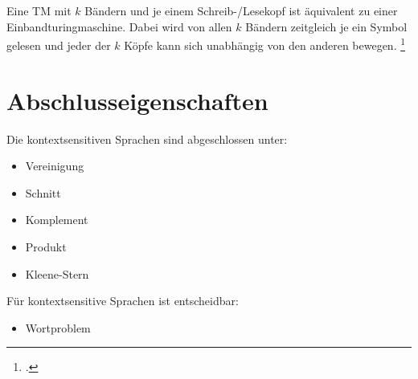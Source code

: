 \documentclass{lehramt-informatik-haupt}
\begin{document}
Eine TM mit $k$ Bändern und je einem Schreib-/Lesekopf ist
äquivalent zu einer Einbandturingmaschine. Dabei wird von allen $k$
Bändern zeitgleich je ein Symbol gelesen und jeder der $k$ Köpfe
kann sich unabhängig von den anderen bewegen.
\footcite[Seite 26]{theo:fs:3}

%

\section{Abschlusseigenschaften}

Die kontextsensitiven Sprachen sind abgeschlossen unter:

\begin{itemize}
\item Vereinigung
\item Schnitt
\item Komplement
\item Produkt
\item Kleene-Stern
\end{itemize}

Für kontextsensitive Sprachen ist entscheidbar:

\begin{itemize}
\item Wortproblem
\end{itemize}

\literatur
\end{document}
